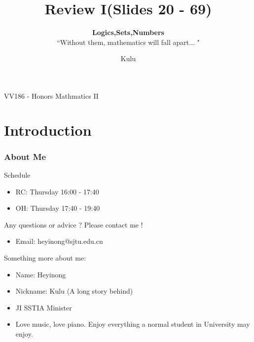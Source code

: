 \documentclass{beamer}
\title{\sffamily Review I(Slides 20 - 69)}
\subtitle{\textbf{Logics,Sets,Numbers}\\``Without them, mathematics will fall apart... "}
\institute[UM-SJTU JI]{University of Michigan-Shanghai Jiao Tong University Joint Institute}
\author{Kulu}
\newcommand{\myfont}{\rmfamily\normalsize\upshape\mdseries}
\begin{document}
\begin{titlepage}
    \begin{center}
        VV186 - Honors Mathmatics II
    \end{center}
\end{titlepage}
\myfont
\section{Introduction}
\begin{frame}
    \frametitle{About Me}
    Schedule
    \begin{itemize}
        \item RC: Thursday 16:00 - 17:40
        \item OH: Thursday 17:40 - 19:40
    \end{itemize}
    Any questions or advice ? Please contact me !
    \begin{itemize}
        \item Email: heyinong@sjtu.edu.cn
    \end{itemize}
    Something more about me:
    \begin{itemize}
        \item Name: Heyinong
        \item Nickname: Kulu (A long story behind)
        \item JI SSTIA Minister
        \item Love music, love piano. Enjoy everything a normal student in University may enjoy.
    \end{itemize}

\end{frame}
\end{document}
